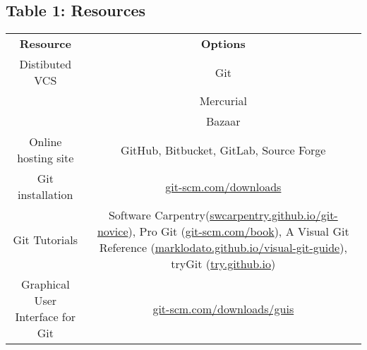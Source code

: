 \subsection{Table 1: Resources}

\begin{tabular}{ c c }
    \textbf{Resource} & \textbf{Options} \\ 
    Distibuted VCS & Git \\
    & Mercurial \\
    & Bazaar \\ 
    Online hosting site & GitHub, Bitbucket, GitLab, Source Forge \\ 
    Git installation & \href{git-scm.com/downloads}{git-scm.com/downloads} \\ 
    Git Tutorials & Software Carpentry(\href{swcarpentry.github.io/git-novice}{swcarpentry.github.io/git-novice}), Pro Git (\href{git-scm.com/book}{git-scm.com/book}), A Visual Git Reference (\href{marklodato.github.io/visual-git-guide}{marklodato.github.io/visual-git-guide}), tryGit (\href{try.github.io}{try.github.io}) \\ 
    Graphical User Interface for Git & \href{git-scm.com/downloads/guis}{git-scm.com/downloads/guis} \\ 
\end{tabular}